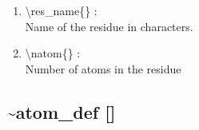 \documentclass[12pt,titlepage]{article}
\begin{document}
\begin{enumerate}

 \vspace{0.15in} 
 \item  \textbackslash{}res\_name\{\} : \\ 
   Name of the residue in characters.

 \vspace{0.15in} 
 \item  \textbackslash{}natom\{\} : \\ 
   Number of atoms in the residue
\end{enumerate}

\newpage
\subsection*{\bf \~{ }atom\_def []} 
\end{document}
